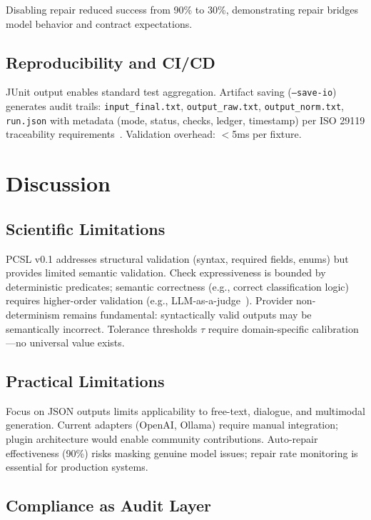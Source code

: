 \documentclass[sigconf]{acmart}
\begin{document}
Disabling repair reduced success from 90\% to 30\%, demonstrating repair bridges model behavior and contract expectations.

\subsection{Reproducibility and CI/CD}

JUnit output enables standard test aggregation. Artifact saving (\texttt{--save-io}) generates audit trails: \texttt{input\_final.txt}, \texttt{output\_raw.txt}, \texttt{output\_norm.txt}, \texttt{run.json} with metadata (mode, status, checks, ledger, timestamp) per ISO 29119 traceability requirements~\cite{iso29119}. Validation overhead: \(<\)5ms per fixture.

\section{Discussion}

\subsection{Scientific Limitations}

PCSL v0.1 addresses structural validation (syntax, required fields, enums) but provides limited semantic validation. Check expressiveness is bounded by deterministic predicates; semantic correctness (e.g., correct classification logic) requires higher-order validation (e.g., LLM-as-a-judge~\cite{zheng2023judging}). Provider non-determinism remains fundamental: syntactically valid outputs may be semantically incorrect. Tolerance thresholds \(\tau\) require domain-specific calibration—no universal value exists.

\subsection{Practical Limitations}

Focus on JSON outputs limits applicability to free-text, dialogue, and multimodal generation. Current adapters (OpenAI, Ollama) require manual integration; plugin architecture would enable community contributions. Auto-repair effectiveness (90\%) risks masking genuine model issues; repair rate monitoring is essential for production systems.

\subsection{Compliance as Audit Layer}
\end{document}
